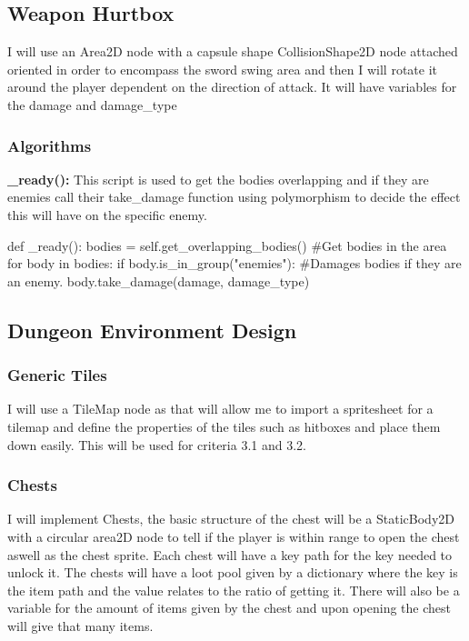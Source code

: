 \documentclass{article}
\begin{document}
        \subsection{Weapon Hurtbox}
        I will use an Area2D node with a capsule shape CollisionShape2D node attached oriented in order to encompass the sword swing area and then I will rotate it around the player dependent on the direction of attack. It will have variables for the damage and damage\_type\\
        \subsubsection{Algorithms}
        \textbf{\_ready():}
        This script is used to get the bodies overlapping and if they are enemies call their take\_damage function using polymorphism to decide the effect this will have on the specific enemy.\\ 
        \begin{python}
def _ready():
   bodies = self.get_overlapping_bodies() #Get bodies in the area
   for body in bodies:
      if body.is_in_group("enemies"): #Damages bodies if they are an enemy.
         body.take_damage(damage, damage_type)
        \end{python}
        \subsection{Dungeon Environment Design}
        \subsubsection{Generic Tiles}
        I will use a TileMap node as that will allow me to import a spritesheet for a tilemap and define the properties of the tiles such as hitboxes and place them down easily. This will be used for criteria 3.1 and 3.2.\\
        \subsubsection{Chests}
        I will implement Chests, the basic structure of the chest will be a StaticBody2D with a circular area2D node to tell if the player is within range to open the chest aswell as the chest sprite. Each chest will have a key path for the key needed to unlock it. The chests will have a loot pool given by a dictionary where the key is the item path and the value relates to the ratio of getting it. There will also be a variable for the amount of items given by the chest and upon opening the chest will give that many items.\\
\end{document}
